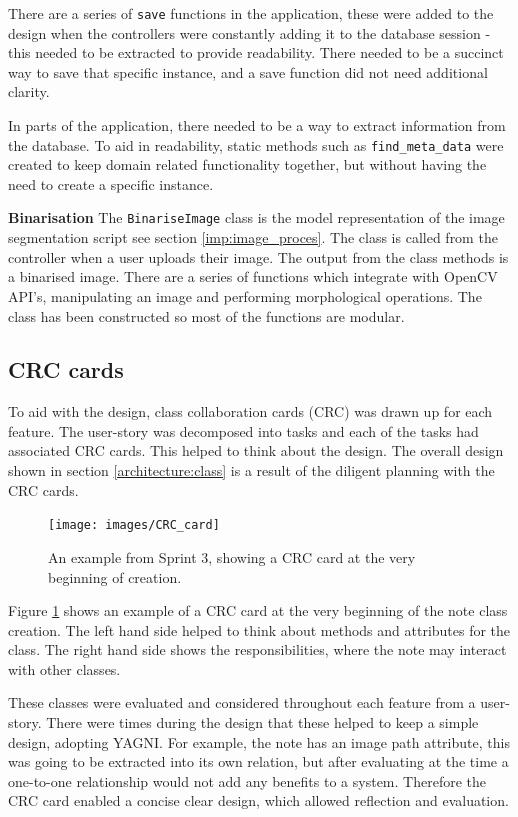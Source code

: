There are a series of \texttt{save} functions in the application, these were added to the design when the controllers were constantly adding it to the database session - this needed to be extracted to provide readability. There needed to be a succinct way to save that specific instance, and a save function did not need additional clarity.

In parts of the application, there needed to be a way to extract information from the database. To aid in readability, static methods such as \texttt{find\_meta\_data} were created to keep domain related functionality together, but without having the need to create a specific instance.

\noindent
\textbf{Binarisation}
\newline
The \texttt{BinariseImage} class is the model representation of the image segmentation script see section \ref{imp:image_proces}. The class is called from the controller when a user uploads their image. The output from the class methods is a binarised image. There are a series of functions which integrate with OpenCV API's, manipulating an image and performing morphological operations. The class has been constructed so most of the functions are modular.

\subsection{CRC cards}
To aid with the design, class collaboration cards (CRC) was drawn up for each feature. The user-story was decomposed into tasks and each of the tasks had associated CRC cards. This helped to think about the design.  The overall design shown in section \ref{architecture:class} is a result of the diligent planning with the CRC cards.

\begin{figure}[H]
  \centering
  \texttt{[image: images/CRC\_card]}
  \caption{An example from Sprint 3, showing a CRC card at the very beginning of creation.}
  \label{fig:crc1}
\end{figure}

Figure \ref{fig:crc1} shows an example of a CRC card at the very beginning of the note class creation. The left hand side helped to think about methods and attributes for the class. The right hand side shows the responsibilities, where the note may interact with other classes.

These classes were evaluated and considered throughout each feature from a user-story. There were times during the design that these helped to keep a simple design, adopting YAGNI. For example, the note has an image path attribute, this was going to be extracted into its own relation, but after evaluating at the time a one-to-one relationship would not add any benefits to a system. Therefore the CRC card enabled a concise clear design, which allowed reflection and evaluation.

